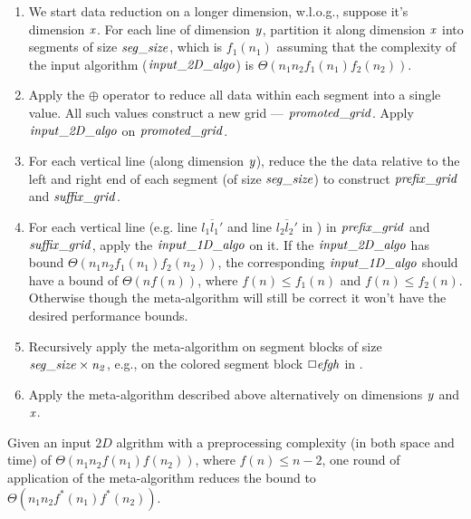 \begin{enumerate}
\item We start data reduction on a longer dimension,
  w.l.o.g., suppose it's dimension $\id{x}$. For
  each line of dimension $\id{y}$, partition it along dimension
  $\id{x}$ into segments of size $\id{seg\_size}$,
  which is $f_{1}(n_1)$ assuming that
  the complexity of the input algorithm ($\id{input\_2D\_algo}$) 
  is $\Theta(n_1 n_2 f_1(n_1) f_2(n_2))$.
%
\item Apply the $\oplus$ operator to reduce
  all data within each segment into a single value. All such values
  construct a new grid --- $\id{promoted\_grid}$. Apply
  $\id{input\_2D\_algo}$ on $\id{promoted\_grid}$.
%
\item For each vertical line (along dimension $\id{y}$), reduce the
  the data relative to the left and right end of each segment (of
  size $\id{seg\_size}$) to construct $\id{prefix\_grid}$ and
  $\id{suffix\_grid}$.
%
\item For each vertical line (e.g. line $\overline{l_1l_1'}$ and
  line $\overline{l_2l_2'}$ in ) in $\id{prefix\_grid}$
  and $\id{suffix\_grid}$, apply the $\id{input\_1D\_algo}$ on it.
  If the $\id{input\_2D\_algo}$ has bound $\Theta(n_1 n_2 f_1(n_1)
  f_2(n_2))$, the corresponding $\id{input\_1D\_algo}$ should have a bound of
  $\Theta(n f(n))$, where $f(n) \leq f_1(n)$ and $f(n) \leq f_2(n)$.
  Otherwise though the meta-algorithm will still be correct
  it won't have the desired performance bounds.
%
\item Recursively apply the meta-algorithm on segment blocks
  of size $\id{seg\_size} \times \id{n_2}$, e.g., on the colored segment block 
  $\Box \id{efgh}$ in .
%
\item Apply the meta-algorithm described above alternatively on dimensions
  $\id{y}$ and $\id{x}$.
%
\end{enumerate}

\begin{theorem}
Given an input $2D$ algrithm with a preprocessing complexity (in both space and time)
of $\Theta(n_1 n_2 f(n_1) f(n_2))$, where $f(n) \leq n-2$,
one round of application of the meta-algorithm
reduces the bound to $\Theta(n_1 n_2 f^*(n_1) f^*(n_2))$.
\label{thm:meta-2D-pp}
\end{theorem}

